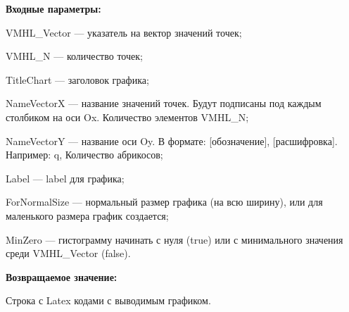 \textbf{Входные параметры:}
 
    VMHL\_Vector --- указатель на вектор значений точек;
 
    VMHL\_N --- количество точек;
 
    TitleChart --- заголовок графика;
 
    NameVectorX --- название значений точек. Будут подписаны под каждым столбиком на оси Ox. Количество элементов VMHL\_N;
 
    NameVectorY --- название оси Oy. В формате: [обозначение], [расшифровка]. Например: q, Количество абрикосов;
 
    Label --- label для графика;
 
    ForNormalSize --- нормальный размер графика (на всю ширину), или для маленького размера график создается;
 
    MinZero --- гистограмму начинать с нуля (true) или с минимального значения среди VMHL\_Vector (false).
	
\textbf{Возвращаемое значение:}

Строка с Latex кодами с выводимым графиком.